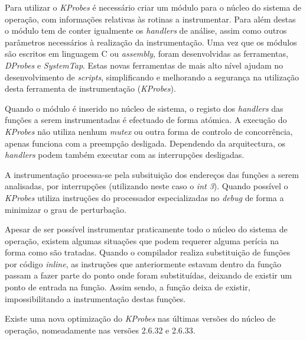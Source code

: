 Para utilizar o \textit{KProbes} é necessário criar um módulo para o núcleo do sistema de operação, com informações relativas às rotinas a instrumentar.
Para além destas o módulo tem de conter igualmente os \textit{handlers} de análise, assim como outros parâmetros necessários à realização da instrumentação.
Uma vez que os módulos são escritos em linguagem C ou \textit{assembly}, foram desenvolvidas as ferramentas, \textit{DProbes} e \textit{SystemTap}.
Estas novas ferramentas de mais alto nível ajudam no desenvolvimento de \textit{scripts}, simplificando e melhorando a segurança na utilização desta ferramenta de instrumentação (\textit{KProbes}).

Quando o módulo é inserido no núcleo de sistema, o registo dos \textit{handlers} das funções a serem instrumentadas é efectuado de forma atómica.
A execução do \textit{KProbes} não utiliza nenhum \textit{mutex} ou outra forma de controlo de concorrência, apenas funciona com a preempção desligada.
Dependendo da arquitectura, os \textit{handlers} podem também executar com as interrupções desligadas.

A instrumentação processa-se pela subsituição dos endereços das funções a serem analisadas, por interrupções (utilizando neste caso o \textit{int 3}).
Quando possível o \textit{KProbes} utiliza instruções do processador especializadas no \textit{debug} de forma a minimizar o grau de perturbação.

Apesar de ser possível instrumentar praticamente todo o núcleo do sistema de operação, existem algumas situações que podem requerer alguma perícia na forma como são tratadas.
Quando o compilador realiza substituição de funções por código \textit{inline}, as instruções que anteriormente estavam dentro da função passam a fazer parte do ponto onde foram substituídas, deixando de existir um ponto de entrada na função.
Assim sendo, a função deixa de existir, impossibilitando a instrumentação destas funções.

Existe uma nova optimização do \textit{KProbes} nas últimas versões do núcleo de operação, nomeadamente nas versões 2.6.32 e 2.6.33.



